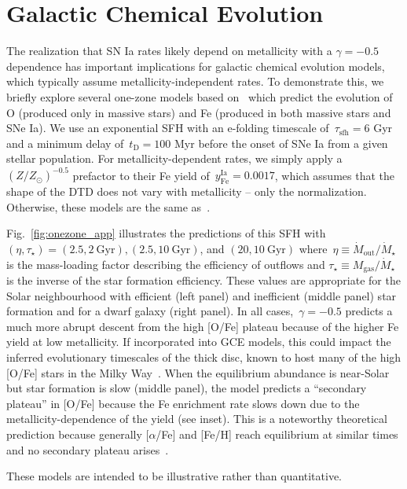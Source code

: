\documentclass[foo.tex]{subfiles}
\begin{document}
\section{Galactic Chemical Evolution}
\label{sec:gce}

The realization that SN Ia rates likely depend on metallicity with a
$\gamma = -0.5$ dependence has important implications for galactic chemical
evolution models, which typically assume metallicity-independent rates.
To demonstrate this, we briefly explore several one-zone models based
on~\citet{Johnson2020} which predict the evolution of O (produced only in
massive stars) and Fe (produced in both massive stars and SNe Ia).
We use an exponential SFH with an e-folding timescale of~$\tau_\text{sfh} = 6$
Gyr and a minimum delay of~$t_\text{D} = 100$ Myr before the onset of SNe Ia
from a given stellar population.
For metallicity-dependent rates, we simply apply a~$(Z / Z_\odot)^{-0.5}$
prefactor to their Fe yield of~$y_\text{Fe}^\text{Ia} = 0.0017$, which assumes
that the shape of the DTD does not vary with metallicity -- only the
normalization.
Otherwise, these models are the same as~\citet{Johnson2020}.
\par
Fig.~\ref{fig:onezone_app} illustrates the predictions of this SFH with
$(\eta, \tau_\star) = (2.5, 2~\text{Gyr}), (2.5, 10~\text{Gyr})$, and
$(20, 10~\text{Gyr})$ where~$\eta \equiv \dot{M}_\text{out} / \dot{M}_\star$ is
the mass-loading factor describing the efficiency of outflows and
$\tau_\star \equiv M_\text{gas} / \dot{M}_\star$ is the inverse of the
star formation efficiency.
These values are appropriate for the Solar neighbourhood with efficient (left
panel) and inefficient (middle panel) star formation and for a dwarf galaxy
(right panel).
In all cases,~$\gamma = -0.5$ predicts a much more abrupt descent from the
high [O/Fe] plateau because of the higher Fe yield at low metallicity.
If incorporated into GCE models, this could impact the inferred evolutionary
timescales of the thick disc, known to host many of the high [O/Fe] stars in
the Milky Way~\citep{Hayden2017}.
When the equilibrium abundance is near-Solar but star formation is slow (middle
panel), the model predicts a ``secondary plateau'' in [O/Fe] because the Fe
enrichment rate slows down due to the metallicity-dependence of the yield
(see inset).
This is a noteworthy theoretical prediction because generally
[$\alpha$/Fe] and [Fe/H] reach equilibrium at similar times and no secondary
plateau arises~\citep[e.g.,][]{Weinberg2017}.
\par
These models are intended to be illustrative rather than quantitative.
\end{document}
